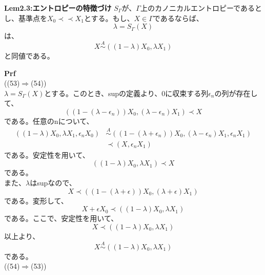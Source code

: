 \documentclass[a4paper,11pt]{jsarticle}
\begin{document}
\begin{itembox}[l]{\textbf{Lem2.3:エントロピーの特徴づけ}}
$S_{\Gamma}$が、$\Gamma$上のカノニカルエントロピーであるとし、基準点を$X_0 \prec \prec X_1$とする。もし、$X\in \Gamma$であるならば、
\begin{equation}
    \lambda = S_{\Gamma}(X)
\end{equation}
は、
\begin{equation}
    X \overset{A}{\sim} ((1-\lambda)X_0,\lambda X_1)
\end{equation}
と同値である。\\

\end{itembox}
\textbf{Prf}\\
((53)$\Rightarrow$(54))\\
$\lambda = S_{\Gamma}(X)$とする。このとき、supの定義より、0に収束する列$\epsilon_n$の列が存在して、
\begin{equation}
    ((1-(\lambda-\epsilon_n))X_0,(\lambda-\epsilon_n)X_1) \prec X
\end{equation}
である。任意のnについて、
\begin{align}
    ((1-\lambda)X_0,\lambda X_1,\epsilon_n X_0) &\overset{A}{\sim} ((1-(\lambda+\epsilon_n))X_0,(\lambda-\epsilon_n)X_1,\epsilon_n X_1)\\
    &\prec (X,\epsilon_n X_1)
\end{align}
である。安定性を用いて、
\begin{equation}
    ((1-\lambda)X_0,\lambda X_1) \prec X
\end{equation}
である。\\
また、$\lambda$はsupなので、
\begin{equation}
    X \prec ((1-(\lambda+\epsilon))X_0,(\lambda+\epsilon)X_1)
\end{equation}
である。変形して、
\begin{equation}
    X+\epsilon X_0 \prec ((1-\lambda)X_0,\lambda X_1)
\end{equation}
である。ここで、安定性を用いて、
\begin{equation}
    X \prec ((1-\lambda)X_0,\lambda X_1)
\end{equation}
以上より、
\begin{equation}
    X \overset{A}{\sim} ((1-\lambda)X_0,\lambda X_1)
\end{equation}
である。 \\

((54)$\Rightarrow$(53))\\
\end{document}
